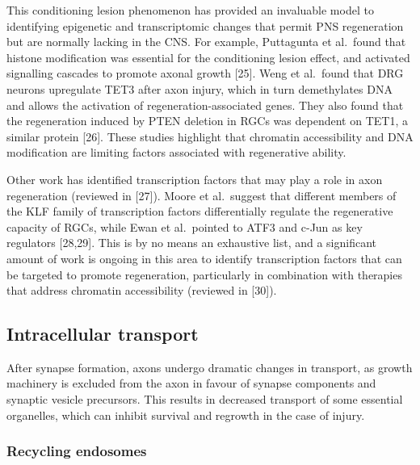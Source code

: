 \documentclass[
  12pt,
  a4paper,
]{book}
\begin{document}
This conditioning lesion phenomenon has provided an invaluable model to identifying epigenetic and transcriptomic changes that permit PNS regeneration but are normally lacking in the CNS. For example, Puttagunta et al.~found that histone modification was essential for the conditioning lesion effect, and activated signalling cascades to promote axonal growth {[}25{]}. Weng et al.~found that DRG neurons upregulate TET3 after axon injury, which in turn demethylates DNA and allows the activation of regeneration-associated genes. They also found that the regeneration induced by PTEN deletion in RGCs was dependent on TET1, a similar protein {[}26{]}. These studies highlight that chromatin accessibility and DNA modification are limiting factors associated with regenerative ability.

Other work has identified transcription factors that may play a role in axon regeneration (reviewed in {[}27{]}). Moore et al.~suggest that different members of the KLF family of transcription factors differentially regulate the regenerative capacity of RGCs, while Ewan et al.~pointed to ATF3 and c-Jun as key regulators {[}28,29{]}. This is by no means an exhaustive list, and a significant amount of work is ongoing in this area to identify transcription factors that can be targeted to promote regeneration, particularly in combination with therapies that address chromatin accessibility (reviewed in {[}30{]}).

\hypertarget{intracellular-transport}{%
\subsection{Intracellular transport}\label{intracellular-transport}}

After synapse formation, axons undergo dramatic changes in transport, as growth machinery is excluded from the axon in favour of synapse components and synaptic vesicle precursors. This results in decreased transport of some essential organelles, which can inhibit survival and regrowth in the case of injury.

\hypertarget{recycling-endosomes}{%
\subsubsection{Recycling endosomes}\label{recycling-endosomes}}
\end{document}
